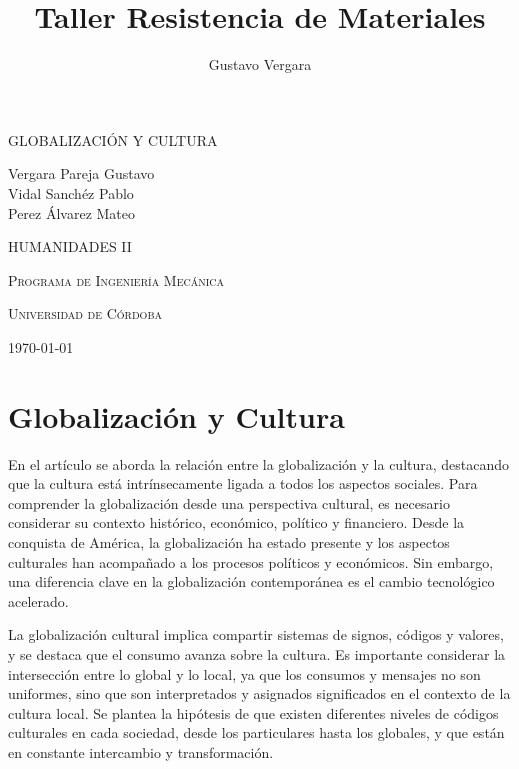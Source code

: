 \documentclass{article}
\title{Taller Resistencia de Materiales}
\author{Gustavo Vergara}
\theoremstyle{mytheoremstyle}
\theoremstyle{mytheoremstyle}
\theoremstyle{myproblemstyle}
\begin{document}
    \begin{titlepage}
\centering


\vspace{3cm}
{\scshape\Huge GLOBALIZACIÓN Y CULTURA \par}
\vspace{4cm}
\textbf\large\scshape{\par}
     \vspace{3cm}
     
{\Large Vergara Pareja Gustavo\\Vidal Sanchéz Pablo\\Perez Álvarez Mateo\\\par}
\vspace{5cm}
{\scshape\Large HUMANIDADES II \par}
\vspace{0.5cm}
{\scshape\Large Programa de Ingeniería Mecánica \par}
\vspace{0.5cm}
{\scshape\Large Universidad de Córdoba\par}
\vspace{0.5cm}
{\Large \today \par}
\end{titlepage}


 \newpage

\section*{Globalización y Cultura}

En el artículo se aborda la relación entre la globalización y la cultura, destacando que la cultura está intrínsecamente ligada a todos los aspectos sociales. Para comprender la globalización desde una perspectiva cultural, es necesario considerar su contexto histórico, económico, político y financiero. Desde la conquista de América, la globalización ha estado presente y los aspectos culturales han acompañado a los procesos políticos y económicos. Sin embargo, una diferencia clave en la globalización contemporánea es el cambio tecnológico acelerado.

\vspace{1cm}
La globalización cultural implica compartir sistemas de signos, códigos y valores, y se destaca que el consumo avanza sobre la cultura. Es importante considerar la intersección entre lo global y lo local, ya que los consumos y mensajes no son uniformes, sino que son interpretados y asignados significados en el contexto de la cultura local. Se plantea la hipótesis de que existen diferentes niveles de códigos culturales en cada sociedad, desde los particulares hasta los globales, y que están en constante intercambio y transformación.
\vspace{1cm} 
\end{document}
